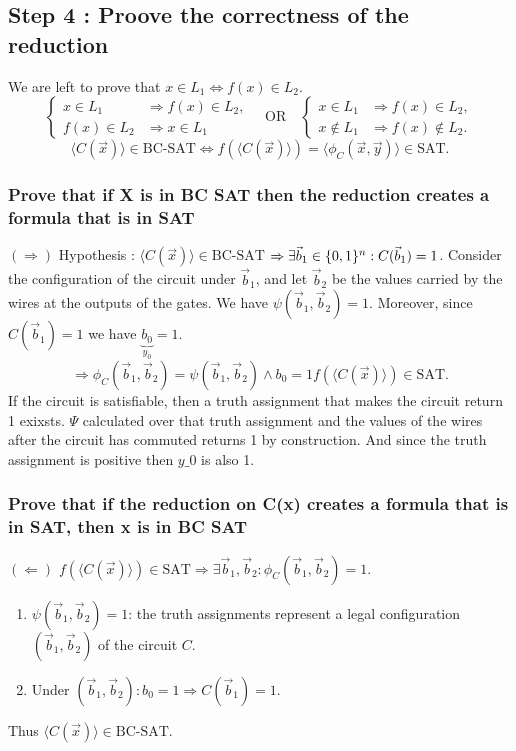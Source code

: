 \subsection{Step 4 : Proove the correctness of the reduction}
We are left to prove that $x\in L_1\Longleftrightarrow f(x)\in L_2$.
\[
\left\{\begin{aligned}x\in L_1&\Rightarrow f(x)\in L_2,\\f(x)\in L_2&\Rightarrow x\in L_1\end{aligned}\right.
\quad\text{OR}\quad
\left\{\begin{aligned}x\in L_1&\Rightarrow f(x)\in L_2,\\x\notin L_1&\Rightarrow f(x)\notin L_2.\end{aligned}\right.
\]
\[
\langle C(\vec x)\rangle\in\mathrm{BC\text{-}SAT}\Longleftrightarrow
f(\langle C(\vec x)\rangle)=\langle\phi_C(\vec x,\vec y)\rangle\in\mathrm{SAT}.
\]
\subsubsection{ Prove that if X is in BC SAT then the reduction creates a formula that is in SAT}
$(\Rightarrow)$ Hypothesis :  $\langle C(\vec x)\rangle\in\mathrm{BC\text{-}SAT}$ $\Rightarrow\exists\vec b_1\in\{0,1\}^n:C(\vec b_1)=1$.
Consider the configuration of the circuit under $\vec b_1$, and let $\vec b_2$ be the values carried by the wires at the outputs of the gates.
We have $\psi(\vec b_1,\vec b_2)=1$.
Moreover, since $C(\vec b_1)=1$ we have $\underbrace{b_0}_{y_0}=1$.
\[
\Rightarrow\phi_C(\vec b_1,\vec b_2)=\psi(\vec b_1,\vec b_2)\land b_0=1 f(\langle C(\vec x)\rangle)\in\mathrm{SAT}.
\]
If the circuit is satisfiable, then a truth assignment that makes the circuit return 1 exixsts. $\Psi$ calculated over that truth assignment and the values of the wires after the circuit has commuted returns 1 by construction. And since the truth assignment is positive then $y\_0$ is also 1. 

\subsubsection{ Prove that if the reduction on C(x) creates a formula that is in SAT, then x is in BC SAT}
$(\Leftarrow)$ $f(\langle C(\vec x)\rangle)\in\mathrm{SAT}\Rightarrow\exists\vec b_1,\vec b_2:\phi_C(\vec b_1,\vec b_2)=1$.
\begin{enumerate}
\item $\psi(\vec b_1,\vec b_2)=1$: the truth assignments represent a legal configuration $(\vec b_1,\vec b_2)$ of the circuit $C$.
\item Under $(\vec b_1,\vec b_2):b_0=1\Rightarrow C(\vec b_1)=1$.
\end{enumerate}
Thus $\langle C(\vec x)\rangle\in\mathrm{BC\text{-}SAT}$.
